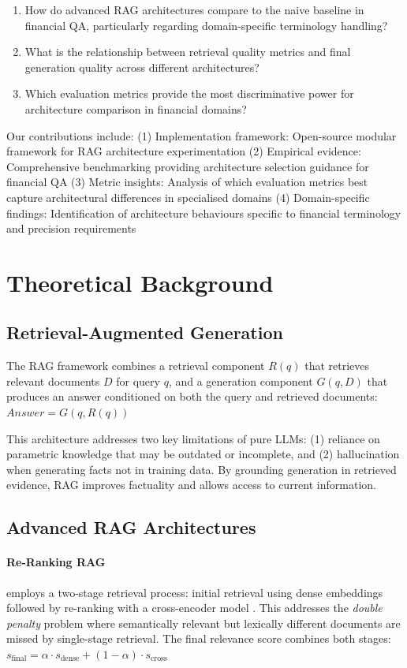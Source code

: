 \documentclass[11pt]{article}
\begin{document}
\begin{enumerate}
    \item How do advanced RAG architectures compare to the naive baseline in 
    financial QA, particularly regarding domain-specific terminology handling?
    \item What is the relationship between retrieval quality metrics and final 
    generation quality across different architectures?
    \item Which evaluation metrics provide the most discriminative power for 
    architecture comparison in financial domains?
\end{enumerate}

Our contributions include: (1) Implementation framework: Open-source modular 
framework for RAG architecture experimentation (2) Empirical evidence: 
Comprehensive benchmarking providing architecture selection guidance for 
financial QA (3) Metric insights: Analysis of which evaluation metrics best 
capture architectural differences in specialised domains (4) Domain-specific 
findings: Identification of architecture behaviours specific to financial 
terminology and precision requirements

\section{Theoretical Background}

\subsection{Retrieval-Augmented Generation}
The RAG framework \citep{lewis2020rag} combines a retrieval component $R(q)$ 
that retrieves relevant documents $D$ for query $q$, and a generation component 
$G(q, D)$ that produces an answer conditioned on both the query and retrieved 
documents: $Answer = G(q, R(q))$

This architecture addresses two key limitations of pure LLMs: (1) reliance on 
parametric knowledge that may be outdated or incomplete, and (2) hallucination 
when generating facts not in training data. By grounding generation in retrieved 
evidence, RAG improves factuality and allows access to current information.

\subsection{Advanced RAG Architectures}

\paragraph{Re-Ranking RAG} employs a two-stage retrieval process: initial 
retrieval using dense embeddings followed by re-ranking with a cross-encoder 
model \citep{nogueira2019multi}. This addresses the \textit{double penalty} 
problem where semantically relevant but lexically different documents are 
missed by single-stage retrieval. The final relevance score combines both stages:
$s_{\text{final}} = \alpha \cdot s_{\text{dense}} + (1-\alpha) \cdot s_{\text{cross}}$
\end{document}

